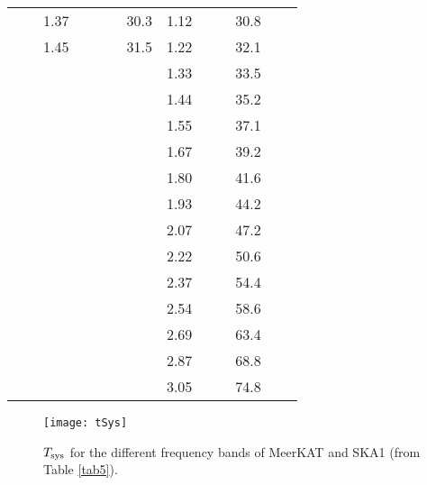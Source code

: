 \begin{table}[! ht]
\begin{tabular}{|l|l|l|l|l|l|l|l|}
          &          & 1.37 & ~~~~~~30.3   & 1.12  & ~~~~30.8 &        &  \\
     
          &          & 1.45 & ~~~~~~31.5   & 1.22  & ~~~~32.1 &        &  \\
    
          &          &      &              & 1.33  & ~~~~33.5 &        &   \\
    
          &          &      &              & 1.44  & ~~~~35.2 &        &    \\
    
          &          &      &              & 1.55  & ~~~~37.1 &        &   \\
    
          &          &      &              & 1.67  & ~~~~39.2 &        &   \\
    
          &          &      &              & 1.80  & ~~~~41.6 &        & \\
    
          &          &      &              & 1.93  & ~~~~44.2 &        &  \\
    
          &          &      &              & 2.07  & ~~~~47.2 &        &  \\
    
          &          &      &              & 2.22  & ~~~~50.6 &        &  \\
    
          &          &      &              & 2.37  & ~~~~54.4 &        &  \\
    
          &          &      &              & 2.54  & ~~~~58.6 &        &  \\
    
          &          &      &              & 2.69  & ~~~~63.4 &        &  \\
    
          &          &      &              & 2.87  & ~~~~68.8 &        &  \\
    
          &          &      &              & 3.05  & ~~~~74.8 &        &  \\
    
    \hline
  \end{tabular}
\end{table}
\vspace*{-0.5cm}
 \begin{figure}[! h]
\centering
\texttt{[image: tSys]}
\vspace*{-0.5cm}
\caption{$T_{\rm sys}$ for the different frequency bands of MeerKAT and SKA1 (from Table \ref{tab5}).} \label{fig2}
\end{figure}